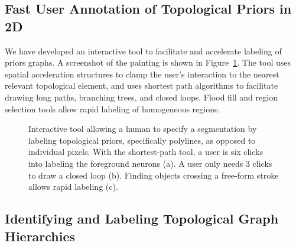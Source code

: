 \vspace{-0.1cm}
\subsection{Fast User Annotation of Topological Priors in 2D}
\label{sec:tool}
We have developed an interactive tool to facilitate and accelerate labeling of priors graphs.  
A screenshot of the painting is shown in 
Figure~\ref{fig:tool}. The tool uses spatial acceleration structures to clamp the user's interaction to the nearest relevant topological element, and uses shortest path algorithms to facilitate drawing long paths, branching trees, and closed loops. Flood fill and region selection tools allow rapid labeling of homogeneous regions. 
\begin{figure}[h]
    \centering
    \caption{Interactive tool allowing a human to specify a segmentation by labeling topological priors, specifically polylines, as opposed to individual pixels. With the shortest-path tool, a user is six clicks into labeling the foreground neurons (a). A user only needs 3 clicks to draw a closed loop (b). Finding objects crossing a free-form stroke allows rapid labeling (c). }
    \label{fig:tool}

    \vspace{-.2cm}
    
\end{figure}

%
%
\vspace{-0.4cm}
\subsection{Identifying and Labeling Topological Graph Hierarchies}
\label{Sec:labeling_hierarchies}

